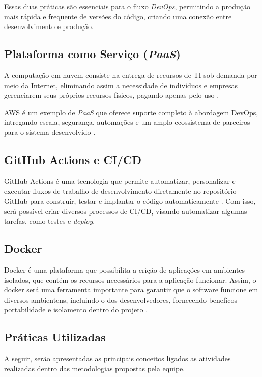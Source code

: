 Essas duas práticas são essenciais para o fluxo \textit{DevOps}, permitindo a produção mais rápida e frequente de versões do código, criando uma conexão entre desenvolvimento e produção.

\subsection{Plataforma como Serviço (\textit{PaaS})}
A computação em nuvem consiste na entrega de recursos de TI sob demanda por meio da Internet, eliminando assim a necessidade de indivíduos e empresas gerenciarem seus próprios recursos físicos, pagando apenas pelo uso \cite{awscloudcomputing}.

AWS é um exemplo de \textit{PaaS} que oferece suporte completo à abordagem DevOps, intregando escala, segurança, automações e um amplo ecossistema de parceiros para o sistema desenvolvido \cite{awsdevops}.

\subsection{GitHub Actions e CI/CD}
GitHub Actions é uma tecnologia que permite automatizar, personalizar e executar fluxos de trabalho de desenvolvimento diretamente no repositório GitHub para construir, testar e implantar o código automaticamente \cite{githubactions}. Com isso, será possível criar diversos processos de CI/CD, visando automatizar algumas tarefas, como testes e \textit{deploy}.

\subsection{Docker}
Docker é uma plataforma que possibilita a crição de aplicações em ambientes isolados, que contém os recursos necessários para a aplicação funcionar. Assim, o docker será uma ferramenta importante para garantir que o software funcione em diversos ambientens, incluindo o dos desenvolvedores, fornecendo benefícos portabilidade e isolamento dentro do projeto \cite{dockerdocs}.

\subsection{Práticas Utilizadas}
A seguir, serão apresentadas as principais conceitos ligados as atividades realizadas dentro das metodologias propostas pela equipe.

